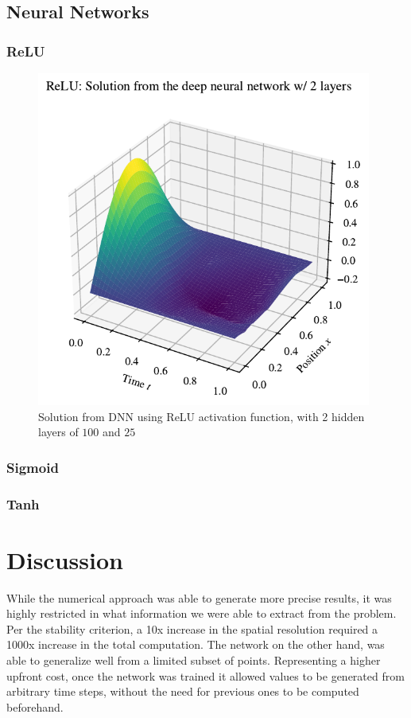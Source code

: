 \documentclass{article}
\theoremstyle{definition}
\begin{document}
\subsection{Neural Networks}

\subsubsection*{ReLU}
\begin{figure}[H]%
    \centering
    \includegraphics[width=11cm]{Project3/figures/ReLU/-4_[100, 25]_dnn.pdf}
    \caption{Solution from DNN using ReLU activation function, with 2 hidden layers of $100$ and $25$}
    \label{fig:ForwardEulerdx=0.001}
\end{figure}

\subsubsection*{Sigmoid}

\subsubsection*{Tanh}


\section{Discussion}
While the numerical approach was able to generate more precise results, it was highly restricted in what information we were able to extract from the problem. Per the stability criterion, a 10x increase in the spatial resolution required a 1000x increase in the total computation. The network on the other hand, was able to generalize well from a limited subset of points. Representing a higher upfront cost, once the network was trained it allowed values to be generated from arbitrary time steps, without the need for previous ones to be computed beforehand.
\end{document}
